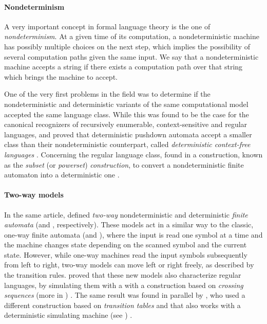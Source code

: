 \paragraph{Nondeterminism} A very important concept in formal language theory is the one of \emph{nondeterminism}.
At a given time of its computation, a nondeterministic machine has possibly multiple choices on the next step, which implies the possibility of several computation paths given the same input.
We say that a nondeterministic machine accepts a string if there exists a computation path over that string which brings the machine to accept.

One of the very first problems in the field was to determine if the nondeterministic and deterministic variants of the same computational model accepted the same language class.
While this was found to be the case for the canonical recognizers of recursively enumerable, context-sensitive and regular languages, \citeauthor{Fis63} and \citeauthor{Sch63} proved that deterministic pushdown automata accept a smaller class than their nondeterministic counterpart, called \emph{deterministic context-free languages} \cite{Fis63,Sch63}.
Concerning the regular language class, \citeauthor{RabSco59} found in \citeyear{RabSco59} a construction, known as the \emph{subset} (or \emph{powerset}) \emph{construction}, to convert a nondeterministic finite automaton into a deterministic one \cite{RabSco59}.

\paragraph{Two-way models} In the same article, \citeauthor{RabSco59} defined \emph{two-way} nondeterministic and deterministic \emph{finite automata} (\TNFA and \TDFA, respectively).
These models act in a similar way to the classic, one-way finite automata (\ONFA and \ODFA), where the input is read one symbol at a time and the machine changes state depending on the scanned symbol and the current state. However, while one-way machines read the input symbols subsequently from left to right, two-way models can move left or right freely, as described by the transition rules.
\citeauthor{RabSco59} proved that these new models also characterize regular languages, by simulating them with a \ONFA with a construction based on \emph{crossing sequences} (more in ) \cite{RabSco59}.
The same result was found in parallel by \citeauthor{She59}, who used a different construction based on \emph{transition tables} and that also works with a deterministic simulating machine (see ) \cite{She59}.



